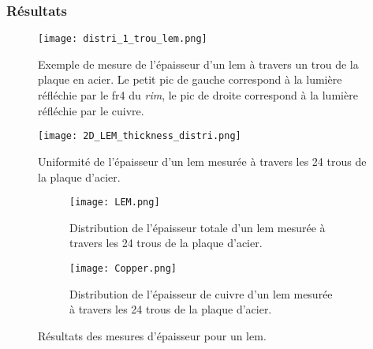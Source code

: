       \subsubsection{Résultats}\label{sec::thickness_result}
         
        \begin{figure}[!htb]
          \centering
          \texttt{[image: distri\_1\_trou\_lem.png]}
          \caption[Exemple de mesure de l'épaisseur d'un LEM]{\label{fig::distri_1_trou_lem}Exemple de mesure de l'épaisseur d'un \gls{lem} à travers un trou de la plaque en acier. Le petit pic de gauche correspond à la lumière réfléchie par le \gls{fr4} du \textit{rim}, le pic de droite correspond à la lumière réfléchie par le cuivre.}
        \end{figure}
        \begin{figure}[!htb]
          \centering
          \texttt{[image: 2D\_LEM\_thickness\_distri.png]}
          \caption[Uniformité de l'épaisseur d'un LEM]{\label{fig::distri_24_trou_lem_2D}Uniformité de l'épaisseur d'un \gls{lem} mesurée à travers les 24 trous de la plaque d'acier.}
        \end{figure}
          
        \begin{figure}[!htb]
          \begin{subfigure}[b]{0.48\textwidth}
            \texttt{[image: LEM.png]}
            \caption{\label{fig::distri_24_trou_lem_1D}Distribution de l'épaisseur totale d'un \gls{lem} mesurée à travers les 24 trous de la plaque d'acier.}
          \end{subfigure}
          \hfill
          \begin{subfigure}[b]{0.48\textwidth}
            \texttt{[image: Copper.png]}
            \caption{\label{fig::distri_24_trou_cuivre_1D}Distribution de l'épaisseur de cuivre d'un \gls{lem} mesurée à travers les 24 trous de la plaque d'acier.}
          \end{subfigure}
          \caption[Résultats des mesures d'épaisseur pour un LEM]{\label{fig::distri_epaisseur_1_lem}Résultats des mesures d'épaisseur pour un \gls{lem}.}
        \end{figure}
                
